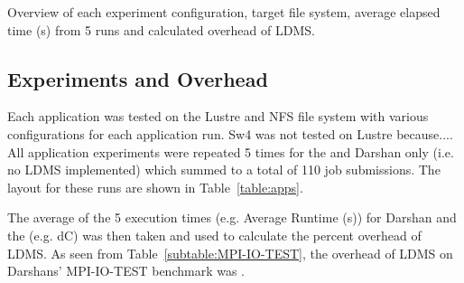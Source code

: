 \begin{table}[h]
\caption{Overview of each experiment configuration, target file system, average elapsed time (s) from 5 runs and calculated overhead of LDMS.}
\label{table:apps}
\end{table}

\subsection{Experiments and Overhead}
Each application was tested on the Lustre and NFS file system with various configurations for each application run. Sw4 was not tested on Lustre because.... All application experiments were repeated 5 times for the \connector{} and Darshan only (i.e. no LDMS implemented) which summed to a total of 110 job submissions. The layout for these runs are shown in Table~\ref{table:apps}.  



The average of the 5 execution times (e.g. Average Runtime (s)) for Darshan and the \connector{} (e.g. dC) was then taken and used to calculate the percent overhead of LDMS. As seen from Table~\ref{subtable:MPI-IO-TEST}, the overhead of LDMS on Darshans' MPI-IO-TEST benchmark was .


